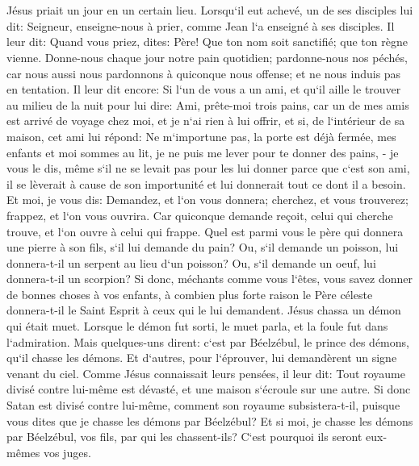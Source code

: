 \chapter{}

\verse Jésus priait un jour en un certain lieu. Lorsqu`il eut achevé, un de ses disciples lui dit: Seigneur, enseigne-nous à prier, comme Jean l`a enseigné à ses disciples. 
\verse Il leur dit: Quand vous priez, dites: Père! Que ton nom soit sanctifié; que ton règne vienne. 
\verse Donne-nous chaque jour notre pain quotidien; 
\verse pardonne-nous nos péchés, car nous aussi nous pardonnons à quiconque nous offense; et ne nous induis pas en tentation. 
\verse Il leur dit encore: Si l`un de vous a un ami, et qu`il aille le trouver au milieu de la nuit pour lui dire: Ami, prête-moi trois pains, 
\verse car un de mes amis est arrivé de voyage chez moi, et je n`ai rien à lui offrir, 
\verse et si, de l`intérieur de sa maison, cet ami lui répond: Ne m`importune pas, la porte est déjà fermée, mes enfants et moi sommes au lit, je ne puis me lever pour te donner des pains, - 
\verse je vous le dis, même s`il ne se levait pas pour les lui donner parce que c`est son ami, il se lèverait à cause de son importunité et lui donnerait tout ce dont il a besoin. 
\verse Et moi, je vous dis: Demandez, et l`on vous donnera; cherchez, et vous trouverez; frappez, et l`on vous ouvrira. 
\verse Car quiconque demande reçoit, celui qui cherche trouve, et l`on ouvre à celui qui frappe. 
\verse Quel est parmi vous le père qui donnera une pierre à son fils, s`il lui demande du pain? Ou, s`il demande un poisson, lui donnera-t-il un serpent au lieu d`un poisson? 
\verse Ou, s`il demande un oeuf, lui donnera-t-il un scorpion? 
\verse Si donc, méchants comme vous l`êtes, vous savez donner de bonnes choses à vos enfants, à combien plus forte raison le Père céleste donnera-t-il le Saint Esprit à ceux qui le lui demandent. 
\verse Jésus chassa un démon qui était muet. Lorsque le démon fut sorti, le muet parla, et la foule fut dans l`admiration. 
\verse Mais quelques-uns dirent: c`est par Béelzébul, le prince des démons, qu`il chasse les démons. 
\verse Et d`autres, pour l`éprouver, lui demandèrent un signe venant du ciel. 
\verse Comme Jésus connaissait leurs pensées, il leur dit: Tout royaume divisé contre lui-même est dévasté, et une maison s`écroule sur une autre. 
\verse Si donc Satan est divisé contre lui-même, comment son royaume subsistera-t-il, puisque vous dites que je chasse les démons par Béelzébul? 
\verse Et si moi, je chasse les démons par Béelzébul, vos fils, par qui les chassent-ils? C`est pourquoi ils seront eux-mêmes vos juges. 
